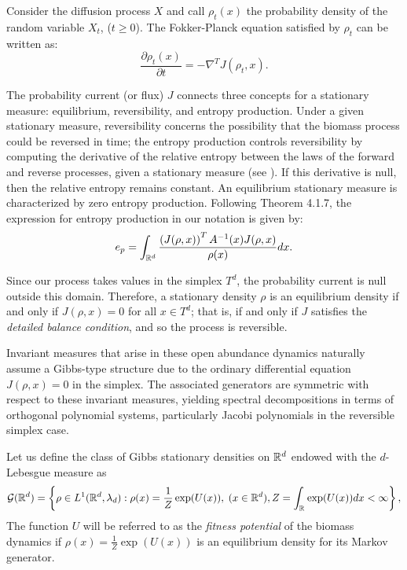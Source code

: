 \documentclass[12pt]{article}
\begin{document}
Consider the diffusion process $X$ and call $\rho_t(x)$ the probability density of the random variable $X_t$, ($t\geq 0$). The Fokker-Planck equation satisfied by $\rho_t$ can be written as:
\begin{equation}
    \frac{\partial \rho_t(x)}{\partial t}=-\nabla^TJ(\rho_t,x).
\end{equation}


The probability current (or flux) $J$ connects three concepts for a stationary measure: equilibrium, reversibility, and entropy production. Under a given stationary measure, reversibility concerns the possibility that the biomass process could be reversed in time; the entropy production controls reversibility by computing the derivative of the relative entropy between the laws of the forward and reverse processes, given a stationary measure (see \cite{Jiang.2004}). If this derivative is null, then the relative entropy remains constant. An equilibrium stationary measure is characterized by zero entropy production. Following \cite{Jiang.2004} Theorem 4.1.7, the expression for entropy production in our notation is given by:
\begin{equation}\label{entprod}
    e_p=\int_{{\mathbb R}^{d}}\frac{\left(J(\rho,x)\right)^TA^{-1}(x)J(\rho,x)}{\rho(x)}dx.
\end{equation}

Since our process takes values in the simplex $T^d$, the probability current is null outside this domain. Therefore, a stationary density $\rho$ is an equilibrium density if and only if $J(\rho,x)=0$ for all $x\in T^d$; that is, if and only if $J$ satisfies the \textit{detailed balance condition}, and so the process is reversible. 

Invariant measures that arise in these open abundance dynamics naturally assume a Gibbs-type structure due to the ordinary differential equation $J(\rho,x)=0$ in the simplex. The associated generators are symmetric with respect to these invariant measures, yielding spectral decompositions in terms of orthogonal polynomial systems, particularly Jacobi polynomials in the reversible simplex case.

Let us define the class of Gibbs stationary densities on ${\mathbb R}^{d}$ endowed with the $d$-Lebesgue measure as 
\begin{equation}
\mathcal{G}({\mathbb R}^{d})=\left\{\rho\in L^1({\mathbb R}^{d},\lambda_d): \rho(x)=\frac{1}{Z}\exp (U(x)), \;(x\in{\mathbb R}^{d}), Z=\int_{{\mathbb R}^{}}\exp (U(x))dx<\infty\right\} ,   
\end{equation}
The function $U$ will be referred to as the \textit{fitness potential} of the biomass dynamics if $\rho(x)=\frac{1}{Z}\exp (U(x))$ is an equilibrium density for its Markov generator. 
\end{document}
